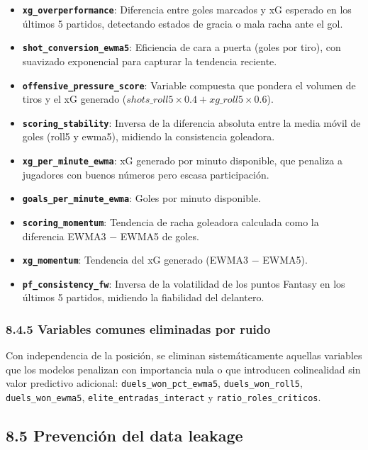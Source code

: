 \begin{itemize}
    \item \textbf{\texttt{xg\_overperformance}}: Diferencia entre goles marcados y xG
    esperado en los últimos 5 partidos, detectando estados de gracia o mala racha ante
    el gol.
    \item \textbf{\texttt{shot\_conversion\_ewma5}}: Eficiencia de cara a puerta
    (goles por tiro), con suavizado exponencial para capturar la tendencia reciente.
    \item \textbf{\texttt{offensive\_pressure\_score}}: Variable compuesta que pondera
    el volumen de tiros y el xG generado ($shots\_roll5 \times 0.4 + xg\_roll5 \times 0.6$).
    \item \textbf{\texttt{scoring\_stability}}: Inversa de la diferencia absoluta entre
    la media móvil de goles (roll5 y ewma5), midiendo la consistencia goleadora.
    \item \textbf{\texttt{xg\_per\_minute\_ewma}}: xG generado por minuto disponible,
    que penaliza a jugadores con buenos números pero escasa participación.
    \item \textbf{\texttt{goals\_per\_minute\_ewma}}: Goles por minuto disponible.
    \item \textbf{\texttt{scoring\_momentum}}: Tendencia de racha goleadora calculada
    como la diferencia EWMA3 $-$ EWMA5 de goles.
    \item \textbf{\texttt{xg\_momentum}}: Tendencia del xG generado (EWMA3 $-$ EWMA5).
    \item \textbf{\texttt{pf\_consistency\_fw}}: Inversa de la volatilidad de los puntos
    Fantasy en los últimos 5 partidos, midiendo la fiabilidad del delantero.
\end{itemize}
 
\subsubsection{8.4.5 Variables comunes eliminadas por ruido}
 
Con independencia de la posición, se eliminan sistemáticamente aquellas variables que
los modelos penalizan con importancia nula o que introducen colinealidad sin valor
predictivo adicional: \texttt{duels\_won\_pct\_ewma5}, \texttt{duels\_won\_roll5},
\texttt{duels\_won\_ewma5}, \texttt{elite\_entradas\_interact} y
\texttt{ratio\_roles\_criticos}.
 
\subsection{8.5 Prevención del data leakage}
 
